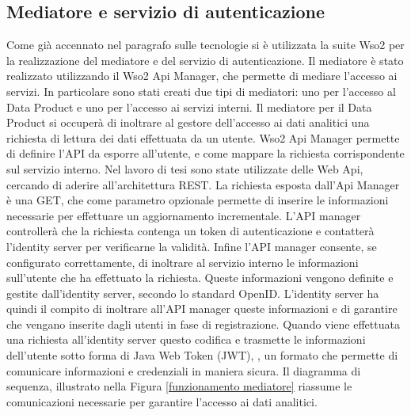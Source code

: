 \documentclass[12pt]{report}
\begin{document}
\subsection{Mediatore e servizio di autenticazione}
Come già accennato nel paragrafo sulle tecnologie si è utilizzata la suite Wso2 per la realizzazione del mediatore e del servizio di autenticazione.
Il mediatore è stato realizzato utilizzando il Wso2 Api Manager, che permette di mediare l'accesso ai servizi.
In particolare sono stati creati due tipi di mediatori: uno per l'accesso al Data Product e uno per l'accesso ai servizi interni.
Il mediatore per il Data Product si occuperà di inoltrare al gestore dell'accesso ai dati analitici una richiesta di lettura dei dati effettuata da un utente.
Wso2 Api Manager permette di definire l'API da esporre all'utente, e come mappare la richiesta corrispondente sul servizio interno. 
Nel lavoro di tesi sono state utilizzate delle Web Api, cercando di aderire all'architettura REST.
La richiesta esposta dall'Api Manager è una GET, che come parametro opzionale permette di inserire le informazioni necessarie per effettuare un aggiornamento incrementale.
L'API manager controllerà che la richiesta contenga un token di autenticazione e contatterà l'identity server per verificarne la validità.
Infine l'API manager consente, se configurato correttamente, di inoltrare al servizio interno le informazioni sull'utente che ha effettuato la richiesta. 
Queste informazioni vengono definite e gestite dall'identity server, secondo lo standard OpenID.
L'identity server ha quindi il compito di inoltrare all'API manager queste informazioni e di garantire che vengano inserite dagli utenti in fase di registrazione.
Quando viene effettuata una richiesta all'identity server questo codifica e trasmette le informazioni dell'utente sotto forma di Java Web Token (JWT), \cite{jwt_documentation}, un formato che permette di comunicare informazioni e credenziali in maniera sicura.
Il diagramma di sequenza, illustrato nella Figura \ref{funzionamento mediatore} riassume le comunicazioni necessarie per garantire l'accesso ai dati analitici.
\end{document}
